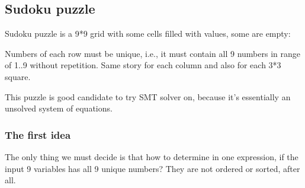 \subsection{Sudoku puzzle}
\label{sudoku_SMT}

Sudoku puzzle is a 9*9 grid with some cells filled with values, some are empty:


\newcommand\setrow[9]{
  \setcounter{col}{1}
  \foreach \n in {#1, #2, #3, #4, #5, #6, #7, #8, #9} {
    \edef\x{\value{col} - 0.5}
    \edef\y{9.5 - \value{row}}
    \node[anchor=center] at (\x, \y) {\n};
    \stepcounter{col}
  }
  \stepcounter{row}
}

\begin{center}
\end{center}

Numbers of each row must be unique, i.e., it must contain all 9 numbers in range of 1..9 without repetition.
Same story for each column and also for each 3*3 square.

This puzzle is good candidate to try \ac{SMT} solver on, because it's essentially an unsolved system of equations.

\subsubsection{The first idea}

The only thing we must decide is that how to determine in one expression, if the input 9 variables has all 9 unique numbers?
They are not ordered or sorted, after all.


